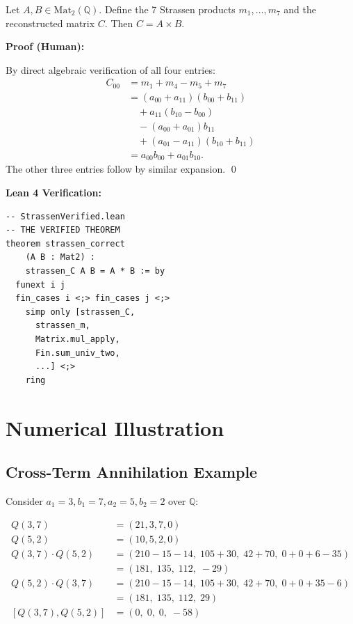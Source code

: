 \begin{theorem}
\label{thm:strassen}
Let $A, B \in \mathrm{Mat}_2(\mathbb{Q})$. Define the 7 Strassen
products $m_1, \ldots, m_7$ and the reconstructed matrix $C$. Then
$C = A \times B$.

\begin{minipage}[t]{0.48\textwidth}
\textbf{Proof (Human):}

By direct algebraic verification of all four entries:
\begin{align*}
  C_{00} &= m_1 + m_4 - m_5 + m_7 \\
         &= (a_{00}+a_{11})(b_{00}+b_{11}) \\
         &\quad + a_{11}(b_{10}-b_{00}) \\
         &\quad - (a_{00}+a_{01})b_{11} \\
         &\quad + (a_{01}-a_{11})(b_{10}+b_{11}) \\
         &= a_{00}b_{00} + a_{01}b_{10}.
\end{align*}
The other three entries follow by similar expansion. \qed
\end{minipage}
\hfill
\begin{minipage}[t]{0.48\textwidth}
\textbf{Lean 4 Verification:}
\begin{lstlisting}[language=lean,basicstyle=\ttfamily\scriptsize]
-- StrassenVerified.lean
-- THE VERIFIED THEOREM
theorem strassen_correct
    (A B : Mat2) :
    strassen_C A B = A * B := by
  funext i j
  fin_cases i <;> fin_cases j <;>
    simp only [strassen_C,
      strassen_m,
      Matrix.mul_apply,
      Fin.sum_univ_two,
      ...] <;>
    ring
\end{lstlisting}
\end{minipage}
\end{theorem}

\section{Numerical Illustration}
\label{sec:numerical}

\subsection{Cross-Term Annihilation Example}

Consider $a_1 = 3, b_1 = 7, a_2 = 5, b_2 = 2$ over $\mathbb{Q}$:

\begin{align*}
  Q(3,7) &= (21, 3, 7, 0) \\
  Q(5,2) &= (10, 5, 2, 0) \\
  Q(3,7) \cdot Q(5,2) &= (210 - 15 - 14,\; 105 + 30,\; 42 + 70,\; 0 + 0 + 6 - 35) \\
                       &= (181,\; 135,\; 112,\; -29) \\
  Q(5,2) \cdot Q(3,7) &= (210 - 15 - 14,\; 105 + 30,\; 42 + 70,\; 0 + 0 + 35 - 6) \\
                       &= (181,\; 135,\; 112,\; 29) \\
  [Q(3,7), Q(5,2)] &= (0,\; 0,\; 0,\; -58)
\end{align*}

